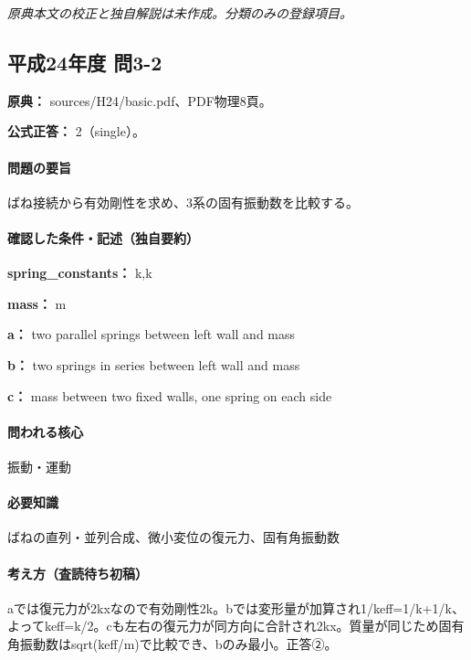 \par\textit{原典本文の校正と独自解説は未作成。分類のみの登録項目。}

\subsection{平成24年度 問3-2}
\label{q:h24-reg-basic-3-2}

\noindent\textbf{原典：} sources/H24/basic.pdf、PDF物理8頁。

\textbf{公式正答：} 2（single）。

\paragraph{問題の要旨} ばね接続から有効剛性を求め、3系の固有振動数を比較する。

\paragraph{確認した条件・記述（独自要約）}\mbox{}\par

\noindent\textbf{spring\_constants：} k,k\par

\noindent\textbf{mass：} m\par

\noindent\textbf{a：} two parallel springs between left wall and mass\par

\noindent\textbf{b：} two springs in series between left wall and mass\par

\noindent\textbf{c：} mass between two fixed walls, one spring on each side\par

\paragraph{問われる核心} 振動・運動

\paragraph{必要知識} ばねの直列・並列合成、微小変位の復元力、固有角振動数

\paragraph{考え方（査読待ち初稿）} aでは復元力が2kxなので有効剛性2k。bでは変形量が加算され1/keff=\allowbreak{}1/k+1/k、よってkeff=\allowbreak{}k/2。cも左右の復元力が同方向に合計され2kx。質量が同じため固有角振動数はsqrt(keff/m)で比較でき、bのみ最小。正答②。

